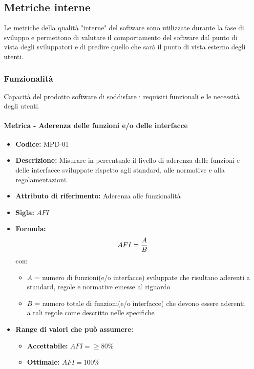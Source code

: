 \subsection{Metriche interne}
 Le metriche della qualità "interne" del software sono utilizzate durante la fase di sviluppo e permettono di valutare il comportamento del software dal punto di vista degli sviluppatori e di predire quello che sarà il punto di vista esterno degli utenti.
  \subsubsection{Funzionalità}
      Capacità del prodotto software di soddisfare i requisiti funzionali e le necessità degli utenti.

              \paragraph{Metrica - Aderenza delle funzioni e/o delle interfacce} 
              \begin{itemize}
          \item  \textbf{Codice:} MPD-01
        \item    \textbf{Descrizione:} Misurare in percentuale il livello di aderenza delle funzioni e delle interfacce sviluppate rispetto agli standard, alle normative e alla regolamentazioni.
          \item  \textbf{Attributo di riferimento:} Aderenza alle funzionalità 
        \item    \textbf{Sigla:} $AFI$
         \item   \textbf{Formula:} $$AFI = {A \over B}$$
                con:
                \begin{itemize}
                    \item  $A$ = numero di funzioni(e/o interfacce) sviluppate che risultano aderenti a standard, regole e normative emesse al riguardo
                    \item  $B$ = numero totale di funzioni(e/o interfacce) che devono essere aderenti a tali regole come descritto nelle specifiche
                \end{itemize}

                \item \textbf{Range di valori che può assumere:}
                \begin{itemize}
                    \item \textbf{Accettabile:} $AFI = \geq80\% $
                    \item \textbf{Ottimale:} $AFI = 100\%$
                \end{itemize}
            \end{itemize}
              
